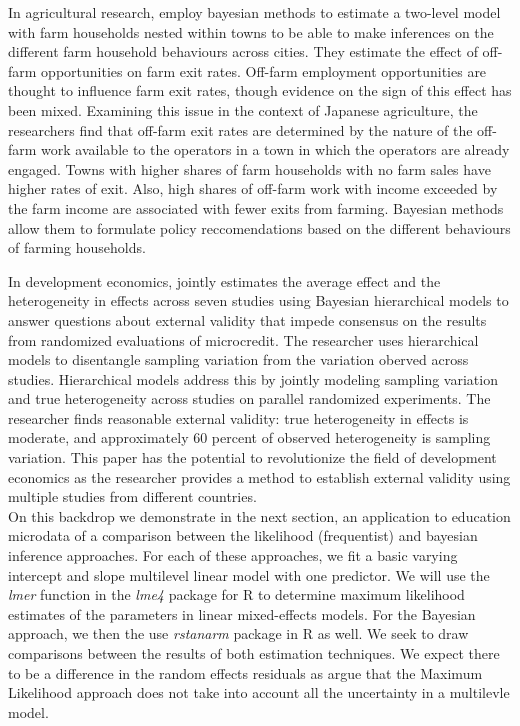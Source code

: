 In agricultural research, \cite{ ramsey2019saying} employ bayesian methods to estimate a two-level model with farm households nested within towns to be able to make inferences on the different farm household behaviours across cities. They estimate the effect of off-farm opportunities on farm exit rates.  Off-farm employment opportunities are thought to influence farm exit rates, though evidence on the sign of this effect has been mixed. Examining this issue in the context of Japanese agriculture, the researchers find that off-farm exit rates are determined by the nature of the off-farm work available to the operators in a town in which the operators are already engaged. Towns with higher shares of farm households with no farm sales have higher rates of exit. Also, high shares of off-farm work with income exceeded by the farm income are associated with fewer exits from farming. Bayesian methods allow them to formulate policy reccomendations based on the different behaviours of farming households.

In development economics, \cite{ meager2019understanding} jointly estimates the average effect and the heterogeneity in effects across seven studies using Bayesian hierarchical models to answer questions about external validity that impede consensus on the results from randomized evaluations of microcredit. The researcher uses hierarchical models to disentangle sampling variation from the variation oberved across studies. Hierarchical models address this by jointly modeling sampling variation and true heterogeneity across studies on parallel randomized experiments.
The researcher finds reasonable external validity: true heterogeneity in effects is moderate, and approximately 60 percent of observed heterogeneity is sampling variation. This paper has the potential to revolutionize the field of development economics as the researcher provides a method to establish external validity using multiple studies from different countries. 
\newline
\\
On this backdrop we demonstrate in the next section, an application to education microdata of a comparison between the likelihood (frequentist)  and bayesian inference approaches. For each of these approaches, we fit a basic varying intercept and slope multilevel linear model with one predictor. We will use the \textit{lmer} function in the \textit{lme4} package for R to determine maximum likelihood estimates of the parameters in linear mixed-effects models. For the Bayesian approach, we then the use \textit{rstanarm} package in R as well. We seek to draw comparisons between the results of both estimation techniques. We expect there to be a difference in the random effects residuals as \cite{browne2006comparison} argue that the Maximum Likelihood approach does not take into account all the uncertainty in a multilevle model.


